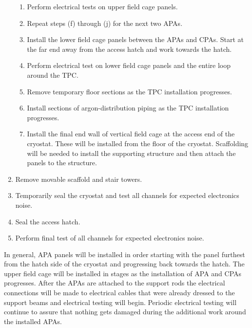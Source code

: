 \begin{enumerate}
\begin{enumerate}
   \item Perform electrical tests on upper field cage panels.
   \item Repeat steps (f) through (j) for the next two APAs.
   \item Install the lower field cage panels between the APAs and CPAs.  Start at the far end away from the access hatch and work towards the hatch. 
   \item Perform electrical test on lower field cage panels and the entire loop around the TPC.
   \item Remove temporary floor sections as the TPC installation progresses.
   \item Install sections of argon-distribution piping as the TPC installation progresses.
   \item Install the final end wall of vertical field cage at the access end of the cryostat.  These will be installed from the floor of the cryostat.  Scaffolding will be needed to install the supporting structure and then attach the panels to the structure.
   \end{enumerate}
\item Remove movable scaffold and stair towers.
\item Temporarily seal the cryostat and test all channels for expected electronics noise.
\item Seal the access hatch.
\item Perform final test of all channels for expected electronics noise.
\end{enumerate}
 
 In general, APA panels will be installed in order starting with the panel furthest from the hatch side of 
 the cryostat and progressing back towards the hatch. The upper field cage will be installed in stages as 
 the installation of APA and CPAs progresses.  After the APAs are attached to the support rods the 
 electrical connections will be made to electrical cables that were already dressed to the support beams 
 and electrical testing will begin. Periodic electrical testing will continue to assure that nothing gets 
 damaged during the additional work around the installed APAs.  

